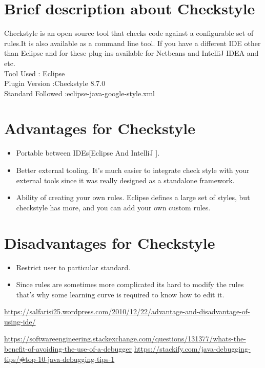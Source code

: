 \documentclass{article}
\begin{document}
\section{Brief description about Checkstyle}
Checkstyle is an open source tool that checks code against a configurable set of rules.It is also available as a command line tool. If you have a different IDE other than Eclipse and for these plug-ins available for Netbeans and IntelliJ IDEA and etc.\\
Tool Used : Eclipse \\
Plugin Version :Checkstyle 8.7.0\\
Standard Followed :eclipse-java-google-style.xml

\section{Advantages for Checkstyle}
\begin{itemize}
  \item Portable between IDEs[Eclipse And IntelliJ ].
  \item Better external tooling. It's much easier to integrate check style with your external tools since it was really designed as a standalone framework.
  \item Ability of creating your own rules. Eclipse defines a large set of styles, but checkstyle has more, and you can add your own custom rules.
\end{itemize}

\section{Disadvantages for Checkstyle}

\begin{itemize}
  \item Restrict user to particular standard.
  \item Since rules are sometimes more complicated its hard to modify the rules that's why some learning curve is required to know how to edit it.
\end{itemize}




  
\begin{thebibliography}{1}

\url{https://salfarisi25.wordpress.com/2010/12/22/advantage-and-disadvantage-of-using-ide/}

\url{https://softwareengineering.stackexchange.com/questions/131377/whats-the-benefit-of-avoiding-the-use-of-a-debugger}
\url{https://stackify.com/java-debugging-tips/#top-10-java-debugging-tips-1}

\end{thebibliography}
\end{document}
